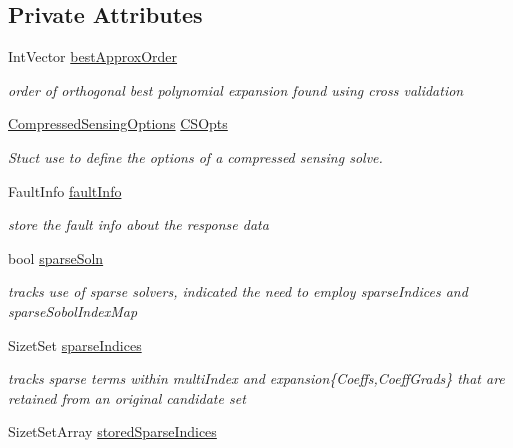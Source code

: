\subsection*{Private Attributes}
\begin{DoxyCompactItemize}
\item 
Int\+Vector \hyperlink{classPecos_1_1RegressOrthogPolyApproximation_a91b7cfcff596c4bf387e9135a7cd2cac}{best\+Approx\+Order}\label{classPecos_1_1RegressOrthogPolyApproximation_a91b7cfcff596c4bf387e9135a7cd2cac}

\begin{DoxyCompactList}\small\item\em order of orthogonal best polynomial expansion found using cross validation \end{DoxyCompactList}\item 
\hyperlink{classPecos_1_1CompressedSensingOptions}{Compressed\+Sensing\+Options} \hyperlink{classPecos_1_1RegressOrthogPolyApproximation_a5cb0a9a62f3b6e4062e40a98f2d4f487}{C\+S\+Opts}\label{classPecos_1_1RegressOrthogPolyApproximation_a5cb0a9a62f3b6e4062e40a98f2d4f487}

\begin{DoxyCompactList}\small\item\em Stuct use to define the options of a compressed sensing solve. \end{DoxyCompactList}\item 
Fault\+Info \hyperlink{classPecos_1_1RegressOrthogPolyApproximation_ab9866069e035ae562cb9e1544c7060ec}{fault\+Info}\label{classPecos_1_1RegressOrthogPolyApproximation_ab9866069e035ae562cb9e1544c7060ec}

\begin{DoxyCompactList}\small\item\em store the fault info about the response data \end{DoxyCompactList}\item 
bool \hyperlink{classPecos_1_1RegressOrthogPolyApproximation_a9ee684244014d5ccdd8966a19509ea18}{sparse\+Soln}\label{classPecos_1_1RegressOrthogPolyApproximation_a9ee684244014d5ccdd8966a19509ea18}

\begin{DoxyCompactList}\small\item\em tracks use of sparse solvers, indicated the need to employ sparse\+Indices and sparse\+Sobol\+Index\+Map \end{DoxyCompactList}\item 
Sizet\+Set \hyperlink{classPecos_1_1RegressOrthogPolyApproximation_a819a2dac4c21386731e1816a76daee0a}{sparse\+Indices}
\begin{DoxyCompactList}\small\item\em tracks sparse terms within multi\+Index and expansion\{Coeffs,Coeff\+Grads\} that are retained from an original candidate set \end{DoxyCompactList}\item 
Sizet\+Set\+Array \hyperlink{classPecos_1_1RegressOrthogPolyApproximation_a3898009a73072d58ec03cfbc01b72775}{stored\+Sparse\+Indices}\label{classPecos_1_1RegressOrthogPolyApproximation_a3898009a73072d58ec03cfbc01b72775}


\end{DoxyCompactItemize}

